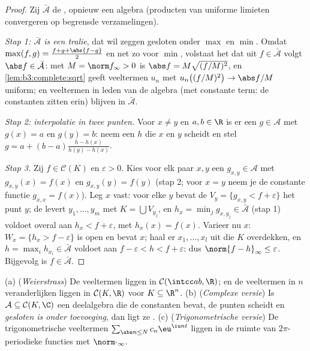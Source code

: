 \begin{proof}
Zij $\bar{\mathcal A}$ de , opnieuw een algebra
(producten van uniforme limieten convergeren op begrensde
verzamelingen).

\emph{Stap 1: $\bar{\mathcal A}$ is een tralie}, dat wil zeggen
gesloten onder $\max$ en $\min$. Omdat $\max(f,g) = \frac{f + g +
\abs{f-g}}2$ en net zo voor $\min$, volstaat het dat uit $f \in
\bar{\mathcal A}$ volgt $\abs f \in \bar{\mathcal A}$: met $M =
\norm f_\infty > 0$ is $\abs f = M\sqrt{(f/M)^2}$, en
\cref{lem:b3:complete:sqrt} geeft veeltermen $u_n$ met
$u_n\bigl((f/M)^2\bigr) \to \abs f/M$ uniform; en veeltermen in
leden van de algebra (met constante term: de constanten zitten
erin) blijven in $\bar{\mathcal A}$.

\emph{Stap 2: interpolatie in twee punten.} Voor $x \neq y$ en $a,
b \in \R$ is er een $g \in \mathcal A$ met $g(x) = a$ en $g(y) =
b$: neem een $h$ die $x$ en $y$ scheidt en stel $g = a + (b -
a)\frac{h - h(x)}{h(y) - h(x)}$.

\emph{Stap 3.} Zij $f \in \mathcal C(K)$ en $\varepsilon > 0$.
Kies voor elk paar $x, y$ een $g_{x,y} \in \mathcal A$ met
$g_{x,y}(x) = f(x)$ en $g_{x,y}(y) = f(y)$ (stap 2; voor $x = y$
neem je de constante functie $g_{x,x} = f(x)$). Leg $x$ vast: voor
elke $y$ bevat de  $V_y = \{g_{x,y} < f +
\varepsilon\}$ het punt $y$; de  levert $y_1, \dots,
y_m$ met $K = \bigcup V_{y_j}$, en $h_x = \min_j g_{x, y_j} \in
\bar{\mathcal A}$ (stap 1) voldoet overal aan $h_x < f +
\varepsilon$, met $h_x(x) = f(x)$. Varieer nu $x$: $W_x = \{h_x >
f - \varepsilon\}$ is open en bevat $x$; haal er $x_1, \dots, x_l$
uit die $K$ overdekken, en $h = \max_i h_{x_i} \in \bar{\mathcal
A}$ voldoet aan $f - \varepsilon < h < f + \varepsilon$: dus
$\norm{f - h}_\infty \leq \varepsilon$. Bijgevolg is $f \in
\bar{\mathcal A}$.
\end{proof}

\begin{corollary}\label{cor:b3:complete:weierstrass}
(a) (\emph{Weierstrass}) De veeltermen liggen  in $\mathcal
C(\intcc ab, \R)$; en de veeltermen in $n$ veranderlijken liggen
 in $\mathcal C(K, \R)$ voor  $K \subseteq \R^n$.
(b) (\emph{Complexe versie}) Is $\mathcal A \subseteq \mathcal
C(K, \C)$ een deelalgebra die de constanten bevat, de punten
scheidt en \emph{gesloten is onder toevoeging}, dan ligt ze .
(c) (\emph{Trigonometrische versie}) De trigonometrische
veeltermen $\sum_{\abs n \leq N}c_n\eu^{\iu n t}$ liggen  in
de ruimte van  $2\pi$-periodieke functies met
$\norm\cdot_\infty$.
\end{corollary}

